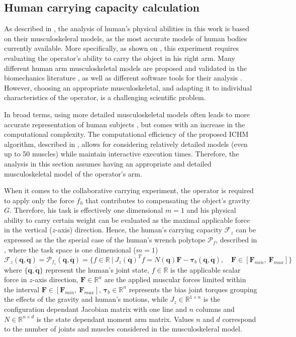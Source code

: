 \subsection{Human carrying capacity calculation}
\label{sec:human_carrying_capacity}

As described in , the analysis of human's physical abilities in this work is based on their musculoskeleral models, as the most accurate models of human bodies currently available.
More specifically, as shown on , this experiment requires evaluating the operator's ability to carry the object in his right arm. 
Many different human arm musculoskeletal models are proposed and validated in the biomechanics literature \cite{holzbaur2005model,saul2015benchmarking}, as well as different software tools for their analysis \cite{opensim,Bouchard2009}. 
However, choosing an appropriate musculoskeletal, and adapting it to individual characteristics of the operator, is a challenging scientific problem. 

In broad terms, using more detailed musculoskeletal models often leads to more accurate representation of human subjects \cite{sohn2019effects}, but comes with an increase in the computational complexity. 
The computational efficiency of the proposed ICHM algorithm, described in , allows for considering relatively detailed models (even up to 50 muscles) while maintain interactive execution times. 
Therefore, the analysis in this section assumes having an appropriate and detailed musculoskeletal model of the operator's arm. 

When it comes to the collaborative carrying experiment, the operator is required to apply only the force $f_{h}$ that contributes to compensating the object's gravity $G$. Therefore, his task is effectively one dimensional $m=1$ and his physical ability to carry certain weight can be evaluated as the maximal applicable force in the vertical ($z$-axis) direction. Hence, the human's carrying capacity $\mathcal{F}_z$ can be expressed as the the special case of the human's wrench polytope $\mathcal{P}_{f}$, described in  , where the task space is one dimensional ($m=1$)
\begin{equation}
     \mathcal{F}_z(\bm{q},\dot{\bm{q}}) = \mathcal{P}_{f_z} (\bm{q},\dot{\bm{q}}) = \{ f \in \mathbb{R} ~|~ J_{z}(\bm{q})^Tf=N(\bm{q})\bm{F} - \bm{\tau}_b(\bm{q},\dot{\bm{q}}), \quad \bm{F}\in[\bm{F}_{min}, ~\bm{F}_{max}]\}
\end{equation}
where $\{\bm{q},\dot{\bm{q}}\}$ represent the human's joint state, $f \in\mathbb{R}$ is the applicable scalar force in $z$-axis direction, $\bm{F}\in\mathbb{R}^n$ are the applied muscular forces limited within the interval $\bm{F}\in[\bm{F}_{min}, ~\bm{F}_{max}]$, $\bm{\tau}_{b}\in\mathbb{R}^n$ represents the bias joint torques grouping the effects of the gravity and human's motions, while $J_{z}\in\mathbb{R}^{1\times n}$ is the configuration dependant Jacobian matrix with one line and $n$ columns and $N\in\mathbb{R}^{n\times d}$ is the state dependant moment arm matrix. Values $n$ and $d$ correspond to the number of joints and muscles considered in the musculoskeleral model.


